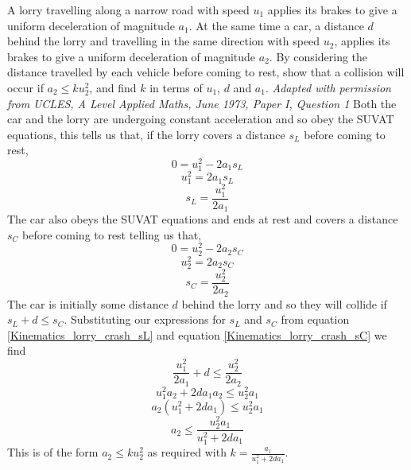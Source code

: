 \begin{problem}[A1973AMIQ1p]
{A lorry travelling along a narrow road with speed $u_1$ applies its brakes to give a uniform deceleration of magnitude $a_1$. At the same time a car, a distance $d$ behind the lorry and travelling in the same direction with speed $u_2$, applies its brakes to give a uniform deceleration of magnitude $a_2$. By considering the distance travelled by each vehicle before coming to rest, show that a collision will occur if $ a_2 \le k u_2^{2}$, and find $k$ in terms of $u_1$, $d$ and $a_1$.
}
{\textit{Adapted with permission from UCLES, A Level Applied Maths, June 1973, Paper I, Question 1}}
{Both the car and the lorry are undergoing constant acceleration and so obey the SUVAT equations, this tells us that, if the lorry covers a distance $s_L$ before coming to rest,
		\begin{equation*}0=u_1^2-2a_1s_L	\end{equation*}
		\begin{equation*}u_1^2=2a_1s_L	\end{equation*}
		\begin{equation}\label{Kinematics_lorry_crash_sL}s_L=\frac{u_1^2}{2a_1}	\end{equation}
	The car also obeys the SUVAT equations and ends at rest and covers a distance $s_C$ before coming to rest telling us that,
		\begin{equation*}0=u_2^2-2a_2s_C	\end{equation*}
		\begin{equation*}u_2^2=2a_2s_C	\end{equation*}
		\begin{equation}\label{Kinematics_lorry_crash_sC}s_C=\frac{u_2^2}{2a_2}	\end{equation}
	The car is initially some distance $d$ behind the lorry and so they will collide if $s_L+d\le s_C$. Substituting our expressions for $s_L$ and $s_C$ from equation \eqref{Kinematics_lorry_crash_sL} and equation \eqref{Kinematics_lorry_crash_sC} we find
		\begin{equation*}\frac{u_1^2}{2a_1}+d\le\frac{u_2^2}{2a_2}		\end{equation*}
		\begin{equation*}u_1^{2}a_2+2da_1a_2\le u_2^{2}a_1			\end{equation*}
		\begin{equation*}a_2\left(u_1^{2}+2da_1\right)\le u_2^{2}a_1		\end{equation*}
		\begin{equation*}a_2\le\frac{u_2^{2}a_1}{u_1^{2} + 2da_1}		\end{equation*}
	This is of the form $a_2\le k u_2^2$ as required with $k=\frac{a_1}{u_1^{2} + 2da_1}$.
}
\end{problem}